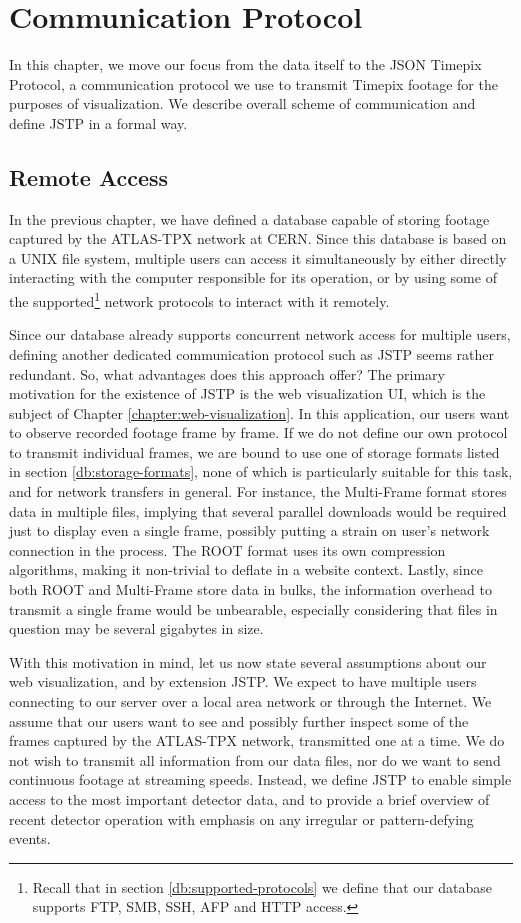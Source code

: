 \chapter{Communication Protocol}
\label{protocol:introduction}

In this chapter, we move our focus from the data itself to the JSON Timepix Protocol, a communication protocol we use to transmit Timepix footage for the purposes of visualization. We describe overall scheme of communication and define JSTP in a formal way.

\section{Remote Access}
In the previous chapter, we have defined a database capable of storing footage captured by the ATLAS-TPX network at CERN. Since this database is based on a UNIX file system, multiple users can access it simultaneously by either directly interacting with the computer responsible for its operation, or by using some of the supported\footnote{Recall that in section \ref{db:supported-protocols} we define that our database supports FTP, SMB, SSH, AFP and HTTP access.} network protocols to interact with it remotely.

Since our database already supports concurrent network access for multiple users, defining another dedicated communication protocol such as JSTP seems rather redundant. So, what advantages does this approach offer? The primary motivation for the existence of JSTP is the web visualization UI, which is the subject of Chapter \ref{chapter:web-visualization}. In this application, our users want to observe recorded footage frame by frame. If we do not define our own protocol to transmit individual frames, we are bound to use one of storage formats listed in section \ref{db:storage-formats}, none of which is particularly suitable for this task, and for network transfers in general. For instance, the Multi-Frame format stores data in multiple files, implying that several parallel downloads would be required just to display even a single frame, possibly putting a strain on user's network connection in the process. The ROOT format uses its own compression algorithms, making it non-trivial to deflate in a website context. Lastly, since both ROOT and Multi-Frame store data in bulks, the information overhead to transmit a single frame would be unbearable, especially considering that files in question may be several gigabytes in size.

With this motivation in mind, let us now state several assumptions about our web visualization, and by extension JSTP. We expect to have multiple users connecting to our server over a local area network or through the Internet. We assume that our users want to see and possibly further inspect some of the frames captured by the ATLAS-TPX network, transmitted one at a time. We do not wish to transmit all information from our data files, nor do we want to send continuous footage at streaming speeds. Instead, we define JSTP to enable simple access to the most important detector data, and to provide a brief overview of recent detector operation with emphasis on any irregular or pattern-defying events.

